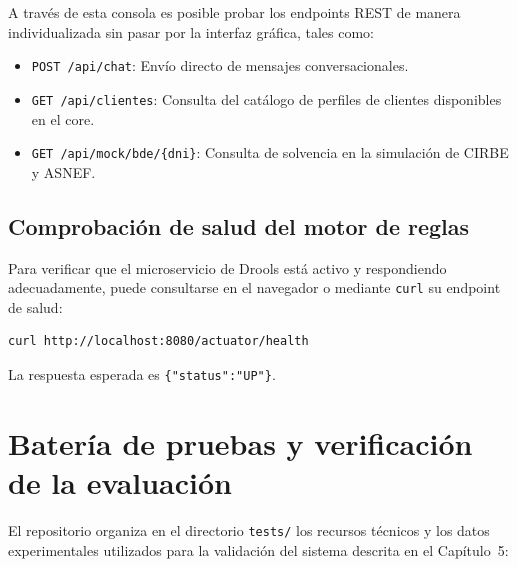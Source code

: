 A través de esta consola es posible probar los endpoints REST de manera individualizada sin pasar por la interfaz gráfica, tales como:
\begin{itemize}
    \item \texttt{POST /api/chat}: Envío directo de mensajes conversacionales.
    \item \texttt{GET /api/clientes}: Consulta del catálogo de perfiles de clientes disponibles en el core.
    \item \texttt{GET /api/mock/bde/\{dni\}}: Consulta de solvencia en la simulación de CIRBE y ASNEF.
\end{itemize}

\subsection{Comprobación de salud del motor de reglas}

Para verificar que el microservicio de Drools está activo y respondiendo adecuadamente, puede consultarse en el navegador o mediante \texttt{curl} su endpoint de salud:

\begin{verbatim}
curl http://localhost:8080/actuator/health
\end{verbatim}

\noindent La respuesta esperada es \texttt{\{"status":"UP"\}}.

\section{Batería de pruebas y verificación de la evaluación}

El repositorio organiza en el directorio \texttt{tests/} los recursos técnicos y los datos experimentales utilizados para la validación del sistema descrita en el Capítulo~5:

